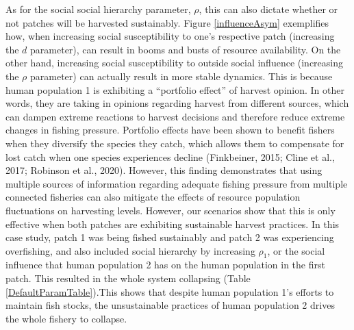 \documentclass[
  12pt,
]{article}
\begin{document}
As for the social social hierarchy parameter, \(\rho\), this can also dictate whether or not patches will be harvested sustainably. Figure \ref{influenceAsym} exemplifies how, when increasing social susceptibility to one's respective patch (increasing the \(d\) parameter), can result in booms and busts of resource availability. On the other hand, increasing social susceptibility to outside social influence (increasing the \(\rho\) parameter) can actually result in more stable dynamics. This is because human population 1 is exhibiting a ``portfolio effect'' of harvest opinion. In other words, they are taking in opinions regarding harvest from different sources, which can dampen extreme reactions to harvest decisions and therefore reduce extreme changes in fishing pressure. Portfolio effects have been shown to benefit fishers when they diversify the species they catch, which allows them to compensate for lost catch when one species experiences decline (Finkbeiner, 2015; Cline et al., 2017; Robinson et al., 2020). However, this finding demonstrates that using multiple sources of information regarding adequate fishing pressure from multiple connected fisheries can also mitigate the effects of resource population fluctuations on harvesting levels. However, our scenarios show that this is only effective when both patches are exhibiting sustainable harvest practices. In this case study, patch 1 was being fished sustainably and patch 2 was experiencing overfishing, and also included social hierarchy by increasing \(\rho_1\), or the social influence that human population 2 has on the human population in the first patch. This resulted in the whole system collapsing (Table \ref{DefaultParamTable}).This shows that despite human population 1's efforts to maintain fish stocks, the unsustainable practices of human population 2 drives the whole fishery to collapse.
\end{document}
